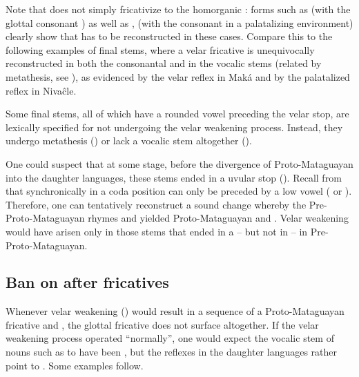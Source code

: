 Note that  does not simply fricativize to the homorganic : forms such as  (with the glottal consonant ) as well as ,  (with the consonant  in a palatalizing environment) clearly show that  has to be reconstructed in these cases. Compare this to the following examples of final stems, where a velar fricative is unequivocally reconstructed in both the consonantal and in the vocalic stems (related by metathesis, see ), as evidenced by the velar reflex  in Maká and by the palatalized reflex  in Nivaĉle.

\begin{exe}
    \ex \bow
    \ex \nose
    \ex \pathn
    \ex \abdcavity
\end{exe}

Some final stems, all of which have a rounded vowel preceding the velar stop, are lexically specified for not undergoing the velar weakening process. Instead, they undergo metathesis () or lack a vocalic stem altogether ().

\begin{exe}
    \ex \leniosa
    \ex \zorzal
    \ex \cat
    \ex \duraznillosgpl
    \ex \palmsgpl
\end{exe}

One could suspect that at some stage, before the divergence of Proto-Mataguayan into the daughter languages, these stems ended in a uvular stop (). Recall from  that synchronically  in a coda position can only be preceded by a low vowel ( or ). Therefore, one can tentatively reconstruct a sound change whereby the Pre-Proto-Mataguayan rhymes  and  yielded Proto-Mataguayan  and . Velar weakening would have arisen only in those stems that ended in a  -- but not in  -- in Pre-Proto-Mataguayan.

\subsection{Ban on  after fricatives}\label{fricative-h}

Whenever velar weakening () would result in a sequence of a Proto-Mataguayan fricative and , the glottal fricative does not surface altogether. If the velar weakening process operated ``normally'', one would expect the vocalic stem of nouns such as  to have been , but the reflexes in the daughter languages rather point to . Some examples follow.

